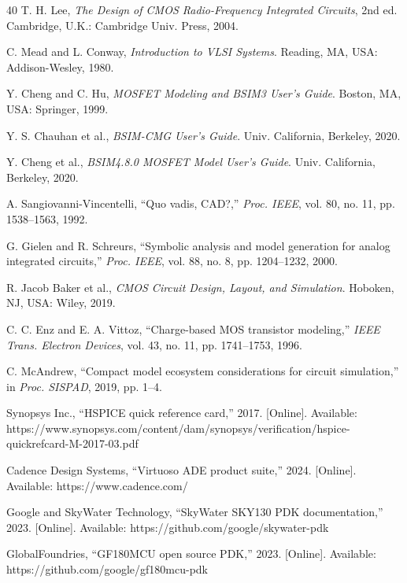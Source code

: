 \documentclass[10pt,twocolumn]{article}
\begin{document}
\begin{thebibliography}{40}
 T. H. Lee, \textit{The Design of CMOS Radio-Frequency Integrated Circuits}, 2nd ed. Cambridge, U.K.: Cambridge Univ. Press, 2004.

 C. Mead and L. Conway, \textit{Introduction to VLSI Systems}. Reading, MA, USA: Addison-Wesley, 1980.

 Y. Cheng and C. Hu, \textit{MOSFET Modeling and BSIM3 User's Guide}. Boston, MA, USA: Springer, 1999.

 Y. S. Chauhan et al., \textit{BSIM-CMG User's Guide}. Univ. California, Berkeley, 2020.

 Y. Cheng et al., \textit{BSIM4.8.0 MOSFET Model User's Guide}. Univ. California, Berkeley, 2020.

 A. Sangiovanni-Vincentelli, ``Quo vadis, CAD?,'' \textit{Proc. IEEE}, vol. 80, no. 11, pp. 1538--1563, 1992.

 G. Gielen and R. Schreurs, ``Symbolic analysis and model generation for analog integrated circuits,'' \textit{Proc. IEEE}, vol. 88, no. 8, pp. 1204--1232, 2000.

 R. Jacob Baker et al., \textit{CMOS Circuit Design, Layout, and Simulation}. Hoboken, NJ, USA: Wiley, 2019.

 C. C. Enz and E. A. Vittoz, ``Charge-based MOS transistor modeling,'' \textit{IEEE Trans. Electron Devices}, vol. 43, no. 11, pp. 1741--1753, 1996.

 C. McAndrew, ``Compact model ecosystem considerations for circuit simulation,'' in \textit{Proc. SISPAD}, 2019, pp. 1--4.

 Synopsys Inc., ``HSPICE quick reference card,'' 2017. [Online]. Available: https://www.synopsys.com/content/dam/synopsys/verification/hspice-quickrefcard-M-2017-03.pdf

 Cadence Design Systems, ``Virtuoso ADE product suite,'' 2024. [Online]. Available: https://www.cadence.com/

 Google and SkyWater Technology, ``SkyWater SKY130 PDK documentation,'' 2023. [Online]. Available: https://github.com/google/skywater-pdk

 GlobalFoundries, ``GF180MCU open source PDK,'' 2023. [Online]. Available: https://github.com/google/gf180mcu-pdk

\end{thebibliography}
\end{document}
